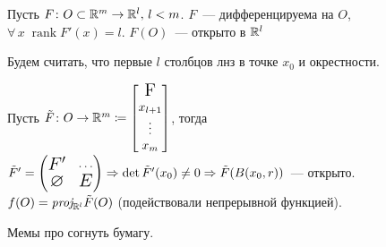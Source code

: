 \begin{Corollary*}
\newcommand{\rank}{\operatorname{rank}}
    Пусть $F\colon O\subset\rmy\to\rmy[l],\,l<m$. $F$~--- дифференцируема на $O$, $\forall\,x\;\rank F'(x)=l$. \THEN $F(O)$~--- открыто в $\rmy[l]$
\end{Corollary*}
\begin{Proof}
    Будем считать, что первые $l$ столбцов лнз в точке $x_0$ и окрестности.
    
    Пусть $\tilde{F}\colon O\to\rmy\coloneqq
    \begin{bmatrix}
       \text{\Large F} \\
       x_{l+1} \\
       \vdots \\
       x_{m}
    \end{bmatrix}$, тогда $\tilde{F}'=
    \begin{pmatrix}
        \Large\text{$F'$} & \cdots \\
        \Large\text{$\varnothing$} & \Large\text{$E$}
    \end{pmatrix}\Rightarrow \det{\tilde{F}'(x_0)\neq 0}\Rightarrow\tilde{F}(B(x_0, r))$~--- открыто.
    $f(O)=\textit{proj}_{\rmy[l]}\tilde{F}(O)$ (подействовали непрерывной функцией).
\end{Proof}

Мемы про согнуть бумагу.

